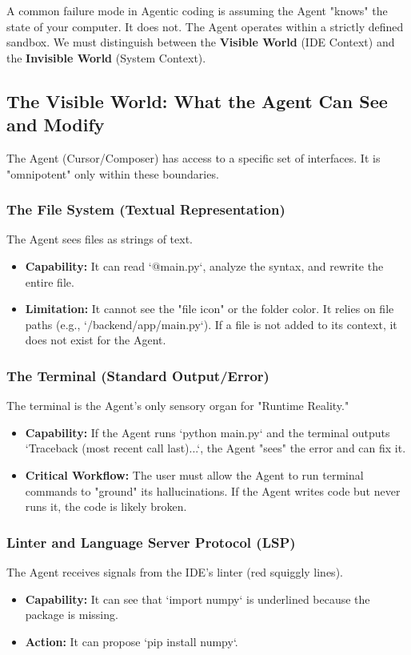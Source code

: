 \documentclass[12pt, a4paper]{article}
\begin{document}
A common failure mode in Agentic coding is assuming the Agent "knows" the state of your computer. It does not. The Agent operates within a strictly defined sandbox. We must distinguish between the \textbf{Visible World} (IDE Context) and the \textbf{Invisible World} (System Context).

\subsection{The Visible World: What the Agent Can See and Modify}

The Agent (Cursor/Composer) has access to a specific set of interfaces. It is "omnipotent" only within these boundaries.

\subsubsection{The File System (Textual Representation)}
The Agent sees files as strings of text. 
\begin{itemize}
    \item \textbf{Capability:} It can read `@main.py`, analyze the syntax, and rewrite the entire file.
    \item \textbf{Limitation:} It cannot see the "file icon" or the folder color. It relies on file paths (e.g., `/backend/app/main.py`). If a file is not added to its context, it does not exist for the Agent.
\end{itemize}

\subsubsection{The Terminal (Standard Output/Error)}
The terminal is the Agent's only sensory organ for "Runtime Reality."
\begin{itemize}
    \item \textbf{Capability:} If the Agent runs `python main.py` and the terminal outputs `Traceback (most recent call last)...`, the Agent "sees" the error and can fix it.
    \item \textbf{Critical Workflow:} The user must allow the Agent to run terminal commands to "ground" its hallucinations. If the Agent writes code but never runs it, the code is likely broken.
\end{itemize}

\subsubsection{Linter and Language Server Protocol (LSP)}
The Agent receives signals from the IDE's linter (red squiggly lines).
\begin{itemize}
    \item \textbf{Capability:} It can see that `import numpy` is underlined because the package is missing.
    \item \textbf{Action:} It can propose `pip install numpy`.
\end{itemize}
\end{document}
